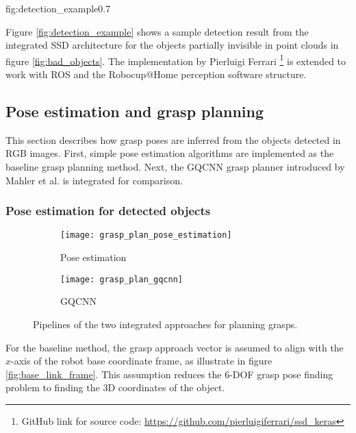 {fig:detection_example}{0.7\textwidth}

Figure \ref{fig:detection_example} shows a sample detection result from the integrated SSD architecture for the objects
partially invisible in point clouds in figure \ref{fig:bad_objects}. The implementation by Pierluigi Ferrari
\footnote{GitHub link for source code: \url{https://github.com/pierluigiferrari/ssd_keras}} is extended to work with
ROS and the Robocup@Home perception software structure. 

\subsection{Pose estimation and grasp planning}

This section describes how grasp poses are inferred from the objects detected in RGB images. First, simple pose
estimation algorithms are implemented as the baseline grasp planning method. Next, the GQCNN grasp planner introduced
by Mahler et al. \cite{mahler2017} is integrated for comparison.

\subsubsection*{Pose estimation for detected objects}

\begin{figure}[h!]
    \centering
    \small
    \begin{subfigure}[b]{0.3\textwidth}
        \texttt{[image: grasp\_plan\_pose\_estimation]}
        \caption{Pose estimation}
        \label{fig:grasp_plan_pose_estimation}
    \end{subfigure}
    \hfill  %
    \begin{subfigure}[b]{0.55\textwidth}
        \texttt{[image: grasp\_plan\_gqcnn]}
        \caption{GQCNN \cite{mahler2017}}
        \label{fig:grasp_plan_gqcnn}
    \end{subfigure}
    \caption{Pipelines of the two integrated approaches for planning grasps.}\label{fig:grasp_planners}
\end{figure}

For the baseline method, the grasp approach vector is assumed to align with the $ x $-axis of the robot base coordinate
frame, as illustrate in figure \ref{fig:base_link_frame}. This assumption reduces the 6-DOF grasp pose finding problem
to finding the 3D coordinates of the object.

